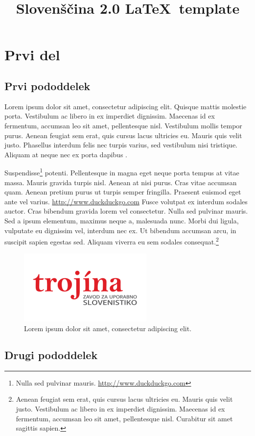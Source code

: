 \documentclass[slovene,georgia]{slo20}
\affiliation{%
Magic and Macaroons Lab, University of Southern Atlantis\\
The Republic, Utopia}
\affiliation{%
ACME Research Group, University of Entenhausen\\
Entenhausen, Germany}
\title{Slovenščina 2.0 \LaTeX\ template}
\begin{document}
\section{Prvi del}

\subsection{Prvi pododdelek}

Lorem ipsum dolor sit amet, consectetur adipiscing elit. Quisque mattis
molestie porta. Vestibulum ac libero in ex imperdiet dignissim. Maecenas id ex
fermentum, accumsan leo sit amet, pellentesque nisl. Vestibulum mollis tempor
purus. Aenean feugiat sem erat, quis cursus lacus ultricies eu. Mauris quis
velit justo.  Phasellus interdum felis nec turpis varius, sed vestibulum nisi
tristique. Aliquam at neque nec ex porta dapibus
\parencite{siepmann2015dictionaries}.

Suspendisse\footnote{ Nulla sed pulvinar mauris.
\url{http://www.duckduckgo.com}} potenti. Pellentesque in magna eget neque
porta tempus at vitae massa. Mauris gravida turpis nisl.  Aenean at nisi purus.
Cras vitae accumsan quam. Aenean pretium purus ut turpis semper fringilla.
Praesent euismod eget ante vel varius. \url{http://www.duckduckgo.com} Fusce
volutpat ex interdum sodales auctor.  Cras bibendum gravida lorem vel
consectetur. Nulla sed pulvinar mauris.  Sed a ipsum elementum, maximus neque
a, malesuada nunc. Morbi dui ligula, vulputate eu dignissim vel, interdum nec
ex. Ut bibendum accumsan arcu, in suscipit sapien egestas sed. Aliquam viverra
eu sem sodales consequat.\footnote{Aenean feugiat sem erat, quis cursus lacus
ultricies eu.  Mauris quis velit justo. Vestibulum ac libero in ex imperdiet
dignissim.  Maecenas id ex fermentum, accumsan leo sit amet, pellentesque nisl.
Curabitur sit amet sagittis sapien.}

\begin{figure}
\centering
\includegraphics[scale=0.75]{trojina}
\caption{%
Lorem ipsum dolor sit amet, consectetur adipiscing elit.}
\end{figure}

\subsection{Drugi pododdelek}
\end{document}
